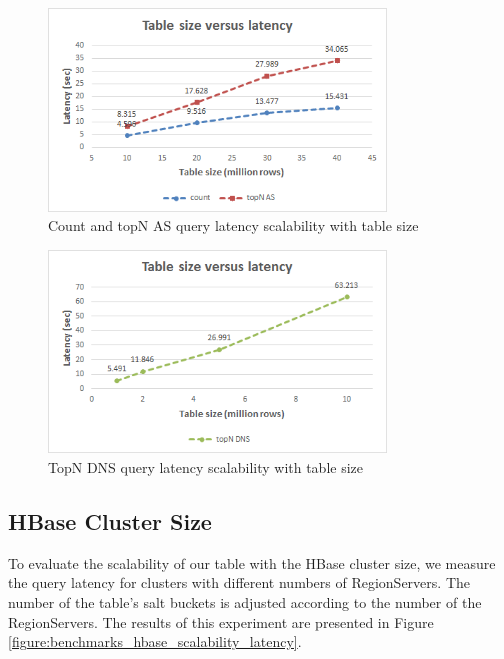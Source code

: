\begin{figure}[H]
\centering
\includegraphics[width=0.8\textwidth]{figures/benchmarks_hbase_rows_latency_1}
\caption{Count and topN AS query latency scalability with table size}
\label{figure:benchmarks_hbase_rows_latency_1}
\end{figure}

\begin{figure}[H]
\centering
\includegraphics[width=0.8\textwidth]{figures/benchmarks_hbase_rows_latency_2}
\caption{TopN DNS query latency scalability with table size}
\label{figure:benchmarks_hbase_rows_latency_2}
\end{figure}

\subsection{HBase Cluster Size}

To evaluate the scalability of our table with the HBase cluster size, we measure the query latency for clusters with different numbers of RegionServers. The number of the table's salt buckets is adjusted according to the number of the RegionServers. The results of this experiment are presented in Figure \ref{figure:benchmarks_hbase_scalability_latency}.

